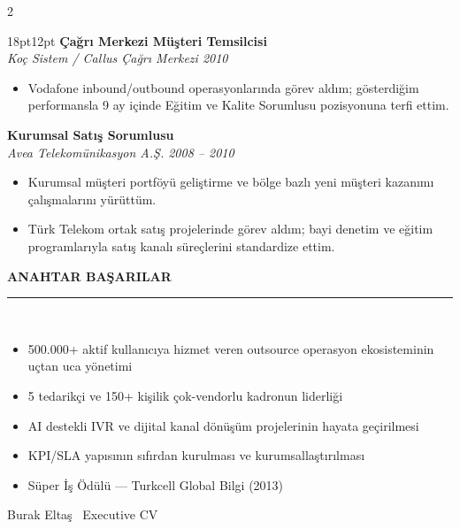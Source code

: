 \documentclass[10pt,a4paper]{article}
\newcommand{\mainSection}[1]{%
  \vspace{8pt}
  {\color{darktext}\bfseries\fontsize{12}{14}\selectfont #1}\\
  {\color{accent}\rule{\linewidth}{1pt}}\\[4pt]
}
\newcommand{\job}[4]{%
  {\color{darktext}\bfseries #1}\\
  {\color{accent}\itshape #2 \hfill #3}\\[2pt]
  \begin{itemize}[leftmargin=12pt,itemsep=1pt,topsep=2pt,label=\textcolor{accent}{$\blacktriangleright$}]
  #4
  \end{itemize}
  \vspace{4pt}
}
\begin{document}
\begin{paracol}{2}
\begin{rightcolumn}
\begin{adjustwidth}{18pt}{12pt}
\job{Çağrı Merkezi Müşteri Temsilcisi}{Koç Sistem / Callus Çağrı Merkezi}{2010}{%
\item Vodafone inbound/outbound operasyonlarında görev aldım; gösterdiğim performansla 9 ay içinde Eğitim ve Kalite Sorumlusu pozisyonuna terfi ettim.
}

\job{Kurumsal Satış Sorumlusu}{Avea Telekomünikasyon A.Ş.}{2008 -- 2010}{%
\item Kurumsal müşteri portföyü geliştirme ve bölge bazlı yeni müşteri kazanımı çalışmalarını yürüttüm.
\item Türk Telekom ortak satış projelerinde görev aldım; bayi denetim ve eğitim programlarıyla satış kanalı süreçlerini standardize ettim.
}

\mainSection{ANAHTAR BAŞARILAR}
\small
\begin{itemize}[leftmargin=12pt,itemsep=2pt,topsep=2pt,label=\textcolor{accent}{$\blacktriangleright$}]
\item 500.000+ aktif kullanıcıya hizmet veren outsource operasyon ekosisteminin uçtan uca yönetimi
\item 5 tedarikçi ve 150+ kişilik çok-vendorlu kadronun liderliği
\item AI destekli IVR ve dijital kanal dönüşüm projelerinin hayata geçirilmesi
\item KPI/SLA yapısının sıfırdan kurulması ve kurumsallaştırılması
\item Süper İş Ödülü --- Turkcell Global Bilgi (2013)
\end{itemize}

\vspace{16pt}
{\small\color{black!60} Burak Eltaş \textperiodcentered\ Executive CV}

\end{adjustwidth}
\end{rightcolumn}

\end{paracol}
\end{document}
